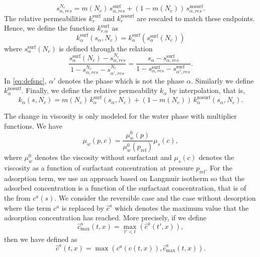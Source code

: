 \documentclass[11pt]{amsart}
\newcommand{\cads}{c^a}
\newcommand{\chatads}{\hat{c}^a}
\newcommand{\pref}{p_\text{ref}}
\newcommand{\surf}{\text{surf}}
\newcommand{\nosurf}{\text{nosurf}}
\begin{document}
\begin{equation}
  \label{eq:srhat}
  s_{\alpha,res}^{N_c} = m(N_c)\,s_{\alpha,res}^{\surf} + (1 - m(N_c))\,s_{\alpha,res}^{\nosurf}.
\end{equation}
The relative permeabilities $k_r^{\surf}$ and $k_r^{\nosurf}$ are rescaled to match these
endpoints. Hence, we define the function $k_{r.\alpha}^{\surf}$ as
\begin{equation}
\label{eq:rescaledkr}
k_{\alpha}^{\surf}(s_\alpha, N_c) = k_\alpha^{\surf}(s_\alpha^{\surf}(N_c))
\end{equation}
where $s_\alpha^{\surf}(N_c)$ is defined through the relation
\begin{equation}
  \label{eq:defsnc}
  \frac{s_\alpha^{\surf}(N_c) - s_{\alpha,res}^{N_c}}{1 - s_{\alpha,res}^{N_c} - s_{\alpha',res}^{N_c}} =   \frac{s_\alpha - s_{\alpha,res}^{\surf}}{1 - s_{\alpha,res}^{\surf} - s_{\alpha',res}^{\surf}}.
\end{equation}
In \eqref{eq:defsnc}, $\alpha'$ denotes the phase which is not the phase $\alpha$. Similarly we
define $k_{\alpha}^{\nosurf}$. Finally, we define the relative permeability $k_{\alpha}$ by
interpolation, that is,
\begin{equation}
  \label{eq:defkralpha}
  k_{\alpha}(s, N_c) = m(N_c)\,k_{\alpha}^{\surf}(s_\alpha, N_c) + (1 - m(N_c))\,k_{\alpha}^{\nosurf}(s_\alpha, N_c).
\end{equation}

The change in viscosity is only modeled for the water phase with multiplier functions. We have
\begin{equation}
  \label{eq:defmuw}
  \mu_w(p, c) = \frac{\mu_w^0(p)}{\mu_w^0(\pref)}\mu_{s}(c),
\end{equation}
where $\mu_w^0$ denotes the viscosity without surfactant and $\mu_s(c)$ denotes the viscosity as a
function of surfactant concentration at pressure $\pref$. For the adsorption term, we use an
approach based on Langmuir isotherm so that the adsorbed concentration is a function of the
surfactant concentration, that is of the from $\cads(s)$. We consider the reversible case and the
case without desorption where the term $\cads$ is replaced by $\hat\cads$ which denotes the
maximum value that the adsorption concentration has reached. More precisely, if we define
\begin{equation}
  \label{eq:chatadsmax}
  \chatads_{\max}(t,x) = \max_{t'<t}(\chatads(t',x)),
\end{equation}
then we have
defined as
\begin{equation}
  \label{eq:defchatads}
  \chatads(t, x) = \max(\cads(c(t,x)), \chatads_{\max}(t,x)).
\end{equation}
\end{document}
